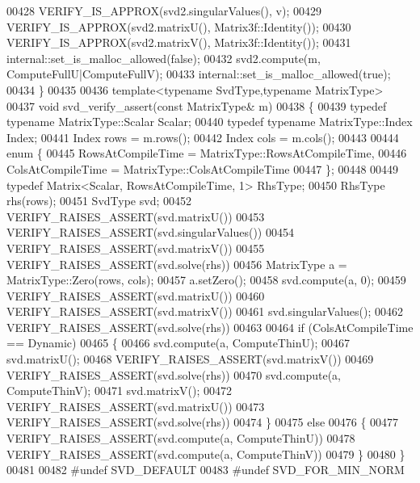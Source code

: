 \begin{DoxyCode}
00428   VERIFY\_IS\_APPROX(svd2.singularValues(), v);
00429   VERIFY\_IS\_APPROX(svd2.matrixU(), Matrix3f::Identity());
00430   VERIFY\_IS\_APPROX(svd2.matrixV(), Matrix3f::Identity());
00431   internal::set\_is\_malloc\_allowed(\textcolor{keyword}{false});
00432   svd2.compute(m, ComputeFullU|ComputeFullV);
00433   internal::set\_is\_malloc\_allowed(\textcolor{keyword}{true});
00434 \}
00435 
00436 \textcolor{keyword}{template}<\textcolor{keyword}{typename} SvdType,\textcolor{keyword}{typename} MatrixType> 
00437 \textcolor{keywordtype}{void} svd\_verify\_assert(\textcolor{keyword}{const} MatrixType& m)
00438 \{
00439   \textcolor{keyword}{typedef} \textcolor{keyword}{typename} MatrixType::Scalar Scalar;
00440   \textcolor{keyword}{typedef} \textcolor{keyword}{typename} MatrixType::Index Index;
00441   Index rows = m.rows();
00442   Index cols = m.cols();
00443 
00444   \textcolor{keyword}{enum} \{
00445     RowsAtCompileTime = MatrixType::RowsAtCompileTime,
00446     ColsAtCompileTime = MatrixType::ColsAtCompileTime
00447   \};
00448 
00449   \textcolor{keyword}{typedef} Matrix<Scalar, RowsAtCompileTime, 1> RhsType;
00450   RhsType rhs(rows);
00451   SvdType svd;
00452   VERIFY\_RAISES\_ASSERT(svd.matrixU())
00453   VERIFY\_RAISES\_ASSERT(svd.singularValues())
00454   VERIFY\_RAISES\_ASSERT(svd.matrixV())
00455   VERIFY\_RAISES\_ASSERT(svd.solve(rhs))
00456   MatrixType a = MatrixType::Zero(rows, cols);
00457   a.setZero();
00458   svd.compute(a, 0);
00459   VERIFY\_RAISES\_ASSERT(svd.matrixU())
00460   VERIFY\_RAISES\_ASSERT(svd.matrixV())
00461   svd.singularValues();
00462   VERIFY\_RAISES\_ASSERT(svd.solve(rhs))
00463     
00464   \textcolor{keywordflow}{if} (ColsAtCompileTime == Dynamic)
00465   \{
00466     svd.compute(a, ComputeThinU);
00467     svd.matrixU();
00468     VERIFY\_RAISES\_ASSERT(svd.matrixV())
00469     VERIFY\_RAISES\_ASSERT(svd.solve(rhs))
00470     svd.compute(a, ComputeThinV);
00471     svd.matrixV();
00472     VERIFY\_RAISES\_ASSERT(svd.matrixU())
00473     VERIFY\_RAISES\_ASSERT(svd.solve(rhs))
00474   \}
00475   \textcolor{keywordflow}{else}
00476   \{
00477     VERIFY\_RAISES\_ASSERT(svd.compute(a, ComputeThinU))
00478     VERIFY\_RAISES\_ASSERT(svd.compute(a, ComputeThinV))
00479   \}
00480 \}
00481 
00482 #undef SVD\_DEFAULT
00483 #undef SVD\_FOR\_MIN\_NORM
\end{DoxyCode}
